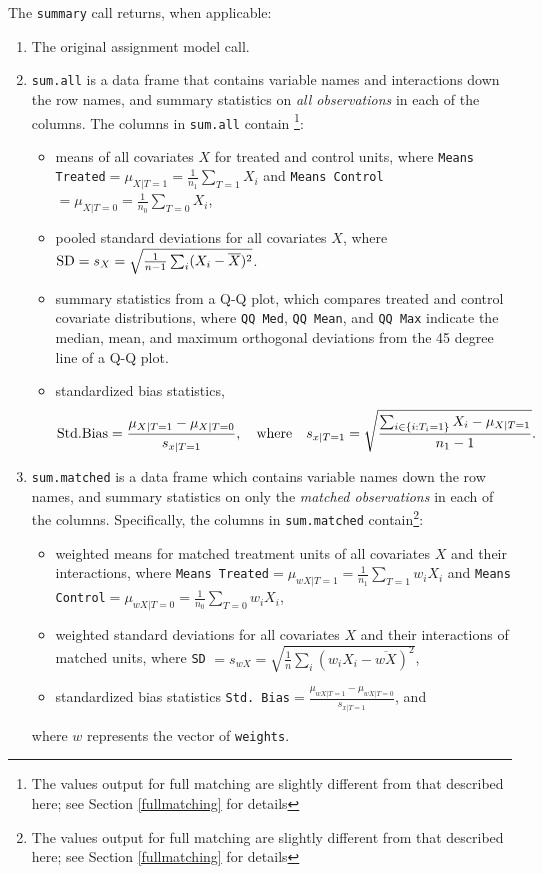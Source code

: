 \documentclass[oneside,letterpaper,titlepage]{article}
\begin{document}
The \texttt{summary} call returns, when applicable:

\begin{enumerate}
\item The original assignment model call.
\item \texttt{sum.all} is a data frame that contains variable names
  and interactions down the row names, and summary statistics on
  \emph{all observations} in each of the columns.  The columns in
  \texttt{sum.all} contain \footnote{The values output for full
    matching are slightly different from that described here; see
    Section \ref{fullmatching} for details}:
  \begin{itemize}
  \item means of all covariates $X$ for treated and control units,
    where \texttt{Means Treated}$= \mu_{X|T=1} = \frac{1}{n_1}
    \sum_{T=1} X_i$ and \texttt{Means Control}$= \mu_{X|T=0} =
    \frac{1}{n_0} \sum_{T=0} X_i$,
  \item pooled standard deviations for all covariates $X$, where ${\rm
      SD} = s_X = \sqrt{\frac{1}{n-1} \sum_{i} (X_i -
      \overline{X})^2}$.
  \item summary statistics from a Q-Q plot, which compares treated and
    control covariate distributions, where \texttt{QQ Med}, \texttt{QQ
      Mean}, and \texttt{QQ Max} indicate the median, mean,
    and maximum orthogonal deviations from the 45 degree line of a Q-Q
    plot.
  \item standardized bias statistics, $${\rm Std.
      Bias}=\frac{\mu_{X|T=1} - \mu_{X|T=0}}{s_{x|T=1}}, \quad {\rm
      where} \quad s_{x|T=1} = \sqrt{\frac{\sum_{i \in \{i:
        T_i=1\}} X_i - \mu_{X|T=1}}{n_1-1} }.$$
  \end{itemize}
  
\item \texttt{sum.matched} is a data frame which contains variable
  names down the row names, and summary statistics on only the
  \emph{matched observations} in each of the columns.  Specifically,
  the columns in \texttt{sum.matched} contain\footnote{The values
    output for full matching are slightly different from that
    described here; see Section \ref{fullmatching} for details}:
  \begin{itemize}
  \item weighted means for matched treatment units of all covariates
    $X$ and their interactions, where \texttt{Means Treated}$=
    \mu_{wX|T=1} = \frac{1}{n_1} \sum_{T=1} w_iX_i$ and \texttt{Means
      Control}$=\mu_{wX|T=0} = \frac{1}{n_0} \sum_{T=0} w_iX_i$,
  \item weighted standard deviations for all covariates $X$ and their
    interactions of matched units, where \texttt{SD} $= s_{wX} =
    \sqrt{\frac{1}{n} \sum_{i} (w_iX_i - \overline{wX})^2}$,
  \item standardized bias statistics \texttt{Std. Bias}$=\frac{\mu_{wX|T=1} -
      \mu_{wX|T=0}}{s_{x|T=1}}$, and
  \end{itemize}
  where $w$ represents the vector of \texttt{weights}.  
  

\end{enumerate}
\end{document}
